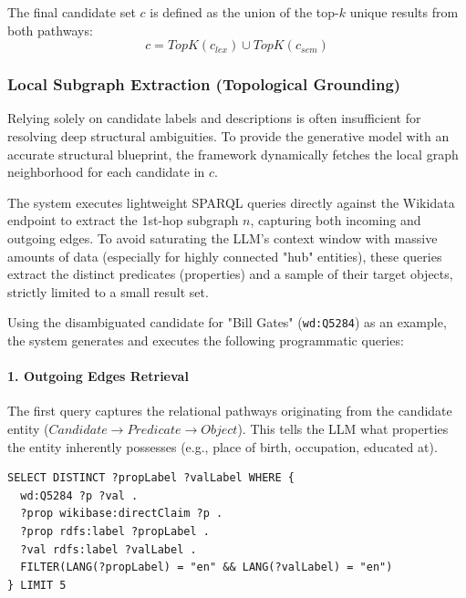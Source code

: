 The final candidate set $c$ is defined as the union of the top-$k$ unique results from both pathways:
\begin{equation}
    c = TopK(c_{lex}) \cup TopK(c_{sem})
\end{equation}

\subsubsection{Local Subgraph Extraction (Topological Grounding)}
\label{sec:topological_grounding}
Relying solely on candidate labels and descriptions is often insufficient for resolving deep structural ambiguities. To provide the generative model with an accurate structural blueprint, the framework dynamically fetches the local graph neighborhood for each candidate in $c$. 

The system executes lightweight SPARQL queries directly against the Wikidata endpoint to extract the 1st-hop subgraph $n$, capturing both incoming and outgoing edges. To avoid saturating the LLM's context window with massive amounts of data (especially for highly connected "hub" entities), these queries extract the distinct predicates (properties) and a sample of their target objects, strictly limited to a small result set.

Using the disambiguated candidate for "Bill Gates" (\texttt{wd:Q5284}) as an example, the system generates and executes the following programmatic queries:

\paragraph{1. Outgoing Edges Retrieval}
The first query captures the relational pathways originating from the candidate entity ($Candidate \rightarrow Predicate \rightarrow Object$). This tells the LLM what properties the entity inherently possesses (e.g., place of birth, occupation, educated at).

\noindent 
\begin{minipage}{\textwidth}
\begin{lstlisting}[basicstyle=\ttfamily\footnotesize, frame=single, caption={SPARQL query dynamically generated by the Retrieval Node to fetch outgoing 1st-hop edges for wd:Q5284.}, label={lst:outgoing_edges}]
SELECT DISTINCT ?propLabel ?valLabel WHERE {
  wd:Q5284 ?p ?val .
  ?prop wikibase:directClaim ?p .
  ?prop rdfs:label ?propLabel .
  ?val rdfs:label ?valLabel .
  FILTER(LANG(?propLabel) = "en" && LANG(?valLabel) = "en")
} LIMIT 5
\end{lstlisting}
\end{minipage}

